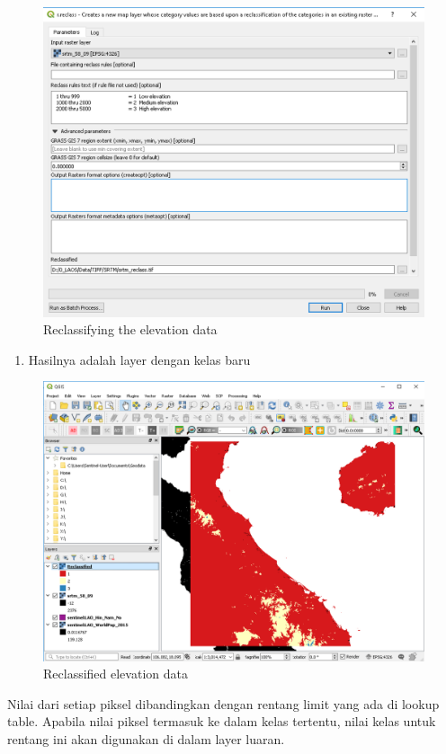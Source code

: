\documentclass[]{book}
\providecommand{\tightlist}{%
  \setlength{\itemsep}{0pt}\setlength{\parskip}{0pt}}
\begin{document}
\begin{figure}

{\centering \includegraphics[width=0.7\linewidth]{images/04/fig74} 

}

\caption{Reclassifying the elevation data}\label{fig:fig1474}
\end{figure}

\begin{enumerate}
\def\labelenumi{\arabic{enumi}.}
\setcounter{enumi}{2}
\tightlist
\item
  Hasilnya adalah layer dengan kelas baru
\end{enumerate}

\begin{figure}

{\centering \includegraphics[width=0.7\linewidth]{images/04/fig75} 

}

\caption{Reclassified elevation data}\label{fig:fig1475}
\end{figure}

Nilai dari setiap piksel dibandingkan dengan rentang limit yang ada di lookup table.
Apabila nilai piksel termasuk ke dalam kelas tertentu, nilai kelas untuk rentang ini akan digunakan di dalam layer luaran.
\end{document}
